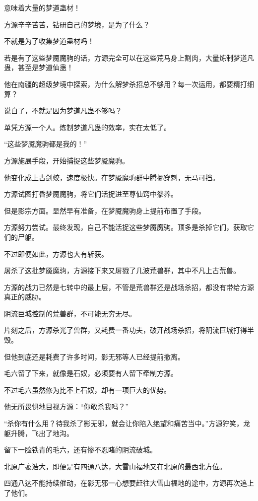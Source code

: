 \begin{this_body}
意味着大量的梦道蛊材！

方源辛辛苦苦，钻研自己的梦境，是为了什么？

不就是为了收集梦道蛊材吗！

若是有了这些梦魇魔驹的话，方源完全可以在这些荒马身上割肉，大量炼制梦道凡蛊，甚至是梦道仙蛊！

他在南疆的超级梦境中探索，为什么解梦杀招总不够用？每一次运用，都要精打细算？

说白了，不就是因为梦道凡蛊不够吗？

单凭方源一个人。炼制梦道凡蛊的效率，实在太低了。

“这些梦魇魔驹都是我的！”

方源施展手段，开始捕捉这些梦魇魔驹。

他变化成上古剑蛟，速度极快。在梦魇魔驹群中腾挪穿刺，无马可挡。

方源试图打昏梦魇魔驹，将它们活捉进至尊仙窍中豢养。

但是影宗方面。显然早有准备，在梦魇魔驹身上提前布置了手段。

方源努力尝试。最终发现，自己不能活捉这些梦魇魔驹。顶多是杀掉它们，获取它们的尸躯。

不过即便如此，方源也大有斩获。

屠杀了这批梦魇魔驹，方源接下来又屠戮了几波荒兽群，其中不凡上古荒兽。

方源的战力已然是七转中的最上层，不管是荒兽群还是战场杀招，都没有带给方源真正的威胁。

阴流巨城控制的荒兽群，不可能无穷无尽。

片刻之后，方源杀光了兽群，又耗费一番功夫，破开战场杀招，将阴流巨城打得半毁。

但他到底还是耗费了许多时间，影无邪等人已经提前撤离。

毛六留了下来，就像是石奴，必须要有人留下牵制方源。

不过毛六虽然修为比不上石奴，却有一项巨大的优势。

他无所畏惧地目视方源：“你敢杀我吗？”

“杀你有什么用？待我杀了影无邪，就会让你陷入绝望和痛苦当中。”方源狞笑，龙躯升腾，飞出了地沟。

留下一脸铁青的毛六，还有惨不忍睹的阴流破城。

北原广袤浩大，即便是有四通八达，大雪山福地又在北原的最西北方位。

四通八达不能持续催动，在影无邪一心想要赶往大雪山福地的途中，方源再次追上了他们。


\end{this_body}
